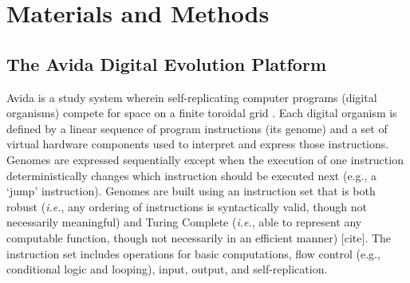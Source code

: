 
\section{Materials and Methods}


\subsection{The Avida Digital Evolution Platform}


Avida is a study system wherein self-replicating computer programs (digital organisms) compete for space on a finite toroidal grid \citep{ofria_avida:_2009}.
Each digital organism is defined by a linear sequence of program instructions (its genome) and a set of virtual hardware components used to interpret and express those instructions. %
Genomes are expressed sequentially except when the execution of one instruction deterministically changes which instruction should be executed next (e.g., a `jump' instruction). 
Genomes are built using an instruction set that is both robust (\textit{i.e.}, any ordering of instructions is syntactically valid, though not necessarily meaningful) and Turing Complete (\textit{i.e.}, able to represent any computable function, though not necessarily in an efficient manner) [cite].
The instruction set includes operations for basic computations, flow control (e.g., conditional logic and looping), input, output, and self-replication.

